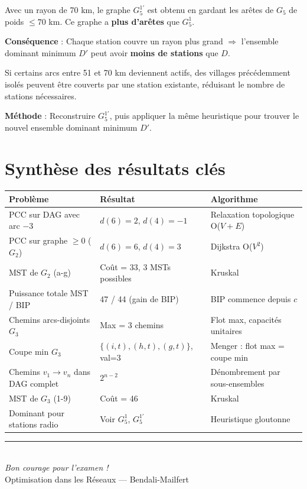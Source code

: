 \documentclass[12pt,a4paper]{article}
\begin{document}
\begin{solution}
Avec un rayon de 70 km, le graphe $G_5^{1'}$ est obtenu en gardant les arêtes de $G_5$ de poids $\le 70$ km. Ce graphe a \textbf{plus d'arêtes} que $G_5^1$.

\textbf{Conséquence} : Chaque station couvre un rayon plus grand $\Rightarrow$ l'ensemble dominant minimum $D'$ peut avoir \textbf{moins de stations} que $D$.

Si certains arcs entre 51 et 70 km deviennent actifs, des villages précédemment isolés peuvent être couverts par une station existante, réduisant le nombre de stations nécessaires.

\textbf{Méthode} : Reconstruire $G_5^{1'}$, puis appliquer la même heuristique pour trouver le nouvel ensemble dominant minimum $D'$.
\end{solution}

\newpage
\section*{\color{titrebleu}Synthèse des résultats clés}

\begin{center}
\renewcommand{\arraystretch}{1.4}
\begin{tabular}{|p{3.5cm}|p{4cm}|p{6.5cm}|}
\hline
\textbf{Problème} & \textbf{Résultat} & \textbf{Algorithme} \\\hline
PCC sur DAG avec arc $-3$ & $d(6)=2$, $d(4)=-1$ & Relaxation topologique O($V+E$) \\\hline
PCC sur graphe $\ge 0$ ($G_2$) & $d(6)=6$, $d(4)=3$ & Dijkstra O($V^2$) \\\hline
MST de $G_2$ (a-g) & Coût = 33, 3 MSTs possibles & Kruskal \\\hline
Puissance totale MST / BIP & 47 / 44 (gain de BIP) & BIP commence depuis $c$ \\\hline
Chemins arcs-disjoints $G_3$ & Max = 3 chemins & Flot max, capacités unitaires \\\hline
Coupe min $G_3$ & $\{(i,t),(h,t),(g,t)\}$, val=3 & Menger : flot max = coupe min \\\hline
Chemins $v_1 \to v_n$ dans DAG complet & $2^{n-2}$ & Dénombrement par sous-ensembles \\\hline
MST de $G_3$ (1-9) & Coût = 46 & Kruskal \\\hline
Dominant pour stations radio & Voir $G_5^1$, $G_5^{1'}$ & Heuristique gloutonne \\\hline
\end{tabular}
\end{center}

\vspace{2em}
\begin{center}
\textcolor{titrebleu}{\rule{0.6\textwidth}{1.5pt}}\\[0.5em]
\textit{\large Bon courage pour l'examen !}\\[0.3em]
\textcolor{defvert}{\small Optimisation dans les Réseaux --- Bendali-Mailfert}
\end{center}
\end{document}
